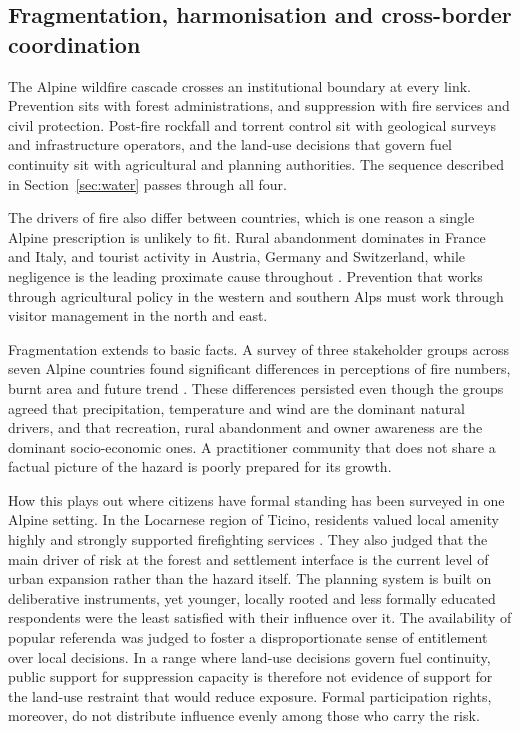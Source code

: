 \documentclass[11pt,a4paper]{article}
\begin{document}
\subsection{Fragmentation, harmonisation and cross-border coordination}

The Alpine wildfire cascade crosses an institutional boundary at every link. Prevention sits with forest administrations, and suppression with fire services and civil protection. Post-fire rockfall and torrent control sit with geological surveys and infrastructure operators, and the land-use decisions that govern fuel continuity sit with agricultural and planning authorities. The sequence described in Section~\ref{sec:water} passes through all four.

The drivers of fire also differ between countries, which is one reason a single Alpine prescription is unlikely to fit. Rural abandonment dominates in France and Italy, and tourist activity in Austria, Germany and Switzerland, while negligence is the leading proximate cause throughout \citep{muller_forest_2020}. Prevention that works through agricultural policy in the western and southern Alps must work through visitor management in the north and east.

Fragmentation extends to basic facts. A survey of three stakeholder groups across seven Alpine countries found significant differences in perceptions of fire numbers, burnt area and future trend \citep{hoang_stakeholders_2026}. These differences persisted even though the groups agreed that precipitation, temperature and wind are the dominant natural drivers, and that recreation, rural abandonment and owner awareness are the dominant socio-economic ones. A practitioner community that does not share a factual picture of the hazard is poorly prepared for its growth.

How this plays out where citizens have formal standing has been surveyed in one Alpine setting. In the Locarnese region of Ticino, residents valued local amenity highly and strongly supported firefighting services \citep{bardsley_wildfire_2021}. They also judged that the main driver of risk at the forest and settlement interface is the current level of urban expansion rather than the hazard itself. The planning system is built on deliberative instruments, yet younger, locally rooted and less formally educated respondents were the least satisfied with their influence over it. The availability of popular referenda was judged to foster a disproportionate sense of entitlement over local decisions. In a range where land-use decisions govern fuel continuity, public support for suppression capacity is therefore not evidence of support for the land-use restraint that would reduce exposure. Formal participation rights, moreover, do not distribute influence evenly among those who carry the risk.
\end{document}
